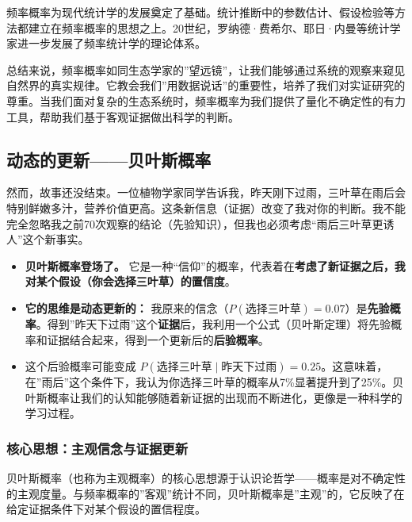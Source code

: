 \documentclass[
]{book}
\providecommand{\tightlist}{%
  \setlength{\itemsep}{0pt}\setlength{\parskip}{0pt}}
\begin{document}
频率概率为现代统计学的发展奠定了基础。统计推断中的参数估计、假设检验等方法都建立在频率概率的思想之上。20世纪，罗纳德·费希尔、耶日·内曼等统计学家进一步发展了频率统计学的理论体系。

总结来说，频率概率如同生态学家的''望远镜''，让我们能够通过系统的观察来窥见自然界的真实规律。它教会我们''用数据说话''的重要性，培养了我们对实证研究的尊重。当我们面对复杂的生态系统时，频率概率为我们提供了量化不确定性的有力工具，帮助我们基于客观证据做出科学的判断。

\hypertarget{ux52a8ux6001ux7684ux66f4ux65b0ux8d1dux53f6ux65afux6982ux7387}{%
\subsection{动态的更新------贝叶斯概率}\label{ux52a8ux6001ux7684ux66f4ux65b0ux8d1dux53f6ux65afux6982ux7387}}

然而，故事还没结束。一位植物学家同学告诉我，昨天刚下过雨，三叶草在雨后会特别鲜嫩多汁，营养价值更高。这条新信息（证据）改变了我对你的判断。我不能完全忽略我之前70次观察的结论（先验知识），但我也必须考虑``雨后三叶草更诱人''这个新事实。

\begin{itemize}
\tightlist
\item
  \textbf{贝叶斯概率登场了。} 它是一种``信仰''的概率，代表着在\textbf{考虑了新证据之后，我对某个假设（你会选择三叶草）的置信度}。
\item
  \textbf{它的思维是动态更新的：} 我原来的信念（\(P(\text{选择三叶草}) = 0.07\)）是\textbf{先验概率}。得到''昨天下过雨''这个\textbf{证据}后，我利用一个公式（贝叶斯定理）将先验概率和证据结合起来，得到一个更新后的\textbf{后验概率}。
\item
  这个后验概率可能变成 \(P(\text{选择三叶草} \mid \text{昨天下过雨}) = 0.25\)。这意味着，在''雨后''这个条件下，我认为你选择三叶草的概率从7\%显著提升到了25\%。贝叶斯概率让我们的认知能够随着新证据的出现而不断进化，更像是一种科学的学习过程。
\end{itemize}

\hypertarget{ux6838ux5fc3ux601dux60f3ux4e3bux89c2ux4fe1ux5ff5ux4e0eux8bc1ux636eux66f4ux65b0}{%
\subsubsection{核心思想：主观信念与证据更新}\label{ux6838ux5fc3ux601dux60f3ux4e3bux89c2ux4fe1ux5ff5ux4e0eux8bc1ux636eux66f4ux65b0}}

贝叶斯概率（也称为主观概率）的核心思想源于认识论哲学------概率是对不确定性的主观度量。与频率概率的''客观''统计不同，贝叶斯概率是''主观''的，它反映了在给定证据条件下对某个假设的置信程度。
\end{document}
